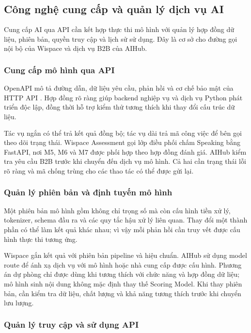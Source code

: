 \subsection{Công nghệ cung cấp và quản lý dịch vụ AI}

Cung cấp AI qua API cần kết hợp thực thi mô hình với quản lý hợp đồng dữ liệu, phiên bản, quyền truy cập và lịch sử sử dụng. Đây là cơ sở cho đường gọi nội bộ của Wispace và dịch vụ B2B của AIHub.

\subsubsection{Cung cấp mô hình qua API}

OpenAPI mô tả đường dẫn, dữ liệu yêu cầu, phản hồi và cơ chế bảo mật của HTTP API \parencite{ch3_openapi}. Hợp đồng rõ ràng giúp backend nghiệp vụ và dịch vụ Python phát triển độc lập, đồng thời hỗ trợ kiểm thử tương thích khi thay đổi cấu trúc dữ liệu.

Tác vụ ngắn có thể trả kết quả đồng bộ; tác vụ dài trả mã công việc để bên gọi theo dõi trạng thái. Wispace Assessment gọi lớp điều phối chấm Speaking bằng FastAPI, nơi M5, M6 và M7 được phối hợp theo hợp đồng đánh giá. AIHub kiểm tra yêu cầu B2B trước khi chuyển đến dịch vụ mô hình. Cả hai cần trạng thái lỗi rõ ràng và mã chống trùng cho các thao tác có thể được gửi lại.

\subsubsection{Quản lý phiên bản và định tuyến mô hình}

Một phiên bản mô hình gồm không chỉ trọng số mà còn cấu hình tiền xử lý, tokenizer, schema đầu ra và các quy tắc hậu xử lý liên quan. Thay đổi một thành phần có thể làm kết quả khác nhau; vì vậy mỗi phản hồi cần truy vết được cấu hình thực thi tương ứng.

Wispace gắn kết quả với phiên bản pipeline và hiệu chuẩn. AIHub sử dụng model route để ánh xạ dịch vụ với mô hình hoặc nhà cung cấp được cấu hình. Phương án dự phòng chỉ được dùng khi tương thích với chức năng và hợp đồng dữ liệu; mô hình sinh nội dung không mặc định thay thế Scoring Model. Khi thay phiên bản, cần kiểm tra dữ liệu, chất lượng và khả năng tương thích trước khi chuyển lưu lượng.

\subsubsection{Quản lý truy cập và sử dụng API}

